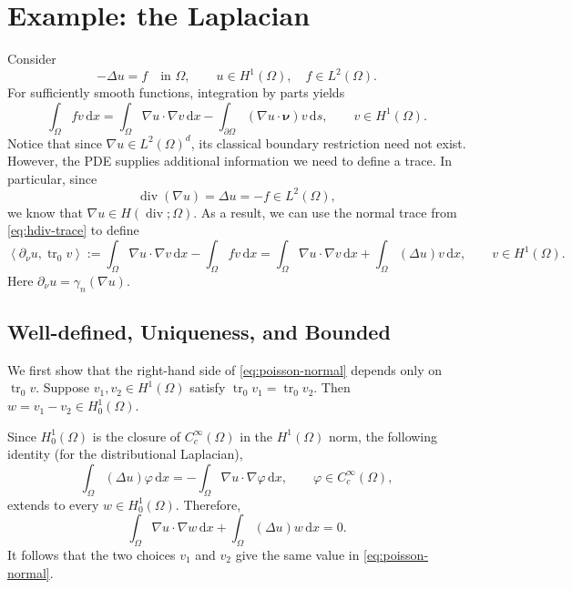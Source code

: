 \documentclass[11pt,a4paper]{article}
\newcommand{\Om}{\Omega}
\newcommand{\dd}{\,\mathrm{d}}
\newcommand{\tr}{\operatorname{tr}}
\newcommand{\Div}{\operatorname{div}}
\newcommand{\grad}{\nabla}
\newcommand{\Hdiv}{H(\Div;\Om)}
\newcommand{\dual}[2]{\left\langle #1,#2\right\rangle}
\begin{document}

\section{Example: the Laplacian}

Consider
\[
    -\Delta u=f\quad\text{in }\Om,
    \qquad u\in H^1(\Om),\quad f\in L^2(\Om).
\]
For sufficiently smooth functions, integration by parts yields
\begin{equation}\label{eq:poisson-green}
    \int_\Om fv\dd x
      =\int_\Om\grad u\cdot\grad v\dd x
       -\int_{\partial\Om}(\grad u\cdot\boldsymbol\nu)v\dd s,
    \qquad v\in H^1(\Om).
\end{equation}
Notice that since $\grad u\in L^2(\Om)^d$, its classical boundary restriction need not
exist. However, the PDE supplies additional information we need to define a trace. In particular, since
\[
    \Div(\grad u)=\Delta u=-f\in L^2(\Om),
\]
we know that $\grad u\in\Hdiv.$ As a result,  we can use the normal trace from
\eqref{eq:hdiv-trace} to define
\begin{equation}\label{eq:poisson-normal}
    \dual{\partial_\nu u}{\tr_0v}
       :=\int_\Om\grad u\cdot\grad v\dd x
         -\int_\Om fv\dd x
       =\int_\Om\grad u\cdot\grad v\dd x
         +\int_\Om(\Delta u)v\dd x,
    \qquad v\in H^1(\Om).
\end{equation}
Here $\partial_\nu u=\gamma_n(\grad u)$.

\subsection*{Well-defined, Uniqueness, and Bounded}

We first show that the right-hand side of \eqref{eq:poisson-normal} depends
only on $\tr_0v$. Suppose $v_1,v_2\in H^1(\Om)$ satisfy
$\tr_0v_1=\tr_0v_2$. Then $w=v_1-v_2\in H^1_0(\Om)$.

Since $H^1_0(\Om)$ is the closure of $C_c^\infty(\Om)$ in the $H^1(\Om)$ norm, the
following identity (for the distributional Laplacian), 
\[
    \int_\Om(\Delta u)\varphi\dd x
        =-\int_\Om\grad u\cdot\grad\varphi\dd x,
    \qquad \varphi\in C_c^\infty(\Om),
\]
extends to every $w\in H^1_0(\Om)$. Therefore,
\[
    \int_\Om\grad u\cdot\grad w\dd x
       +\int_\Om(\Delta u)w\dd x=0.
\]
It follows that the two choices $v_1$ and $v_2$ give the same value in
\eqref{eq:poisson-normal}.
\end{document}
